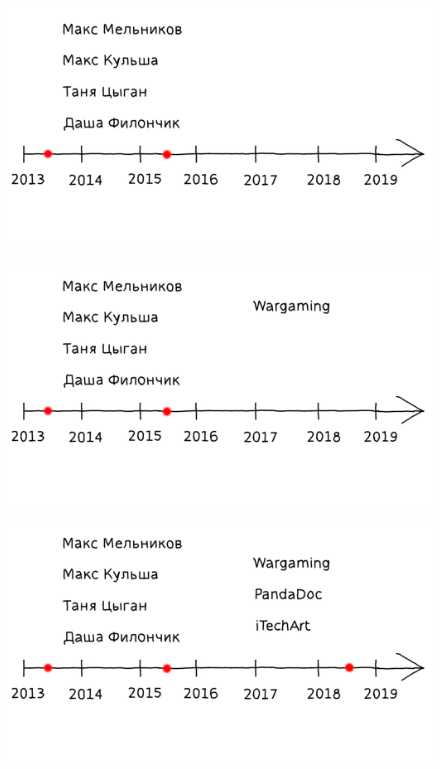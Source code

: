 \documentclass[10pt,pdf,utf8,aspectratio=169,xcolor=dvipsnames,x11names,center]{beamer}
\begin{document}
\begin{frame}
  \begin{figure}
    \includegraphics[scale=0.88]{Slides-02-03}
  \end{figure}
\end{frame}

\begin{frame}
  \begin{figure}
    \includegraphics[scale=0.88]{Slides-02-04}
  \end{figure}
\end{frame}

\begin{frame}
  \begin{figure}
    \includegraphics[scale=0.88]{Slides-02-05}
  \end{figure}
\end{frame}
\end{document}
